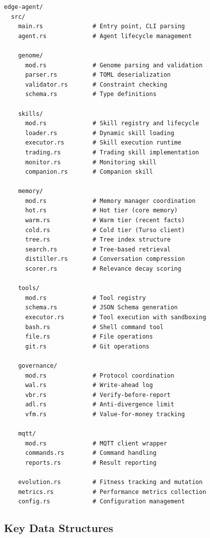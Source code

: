 \documentclass{article}
\begin{document}
\begin{lstlisting}[basicstyle=\ttfamily\footnotesize]
edge-agent/
  src/
    main.rs              # Entry point, CLI parsing
    agent.rs             # Agent lifecycle management
    
    genome/
      mod.rs             # Genome parsing and validation
      parser.rs          # TOML deserialization
      validator.rs       # Constraint checking
      schema.rs          # Type definitions
      
    skills/
      mod.rs             # Skill registry and lifecycle
      loader.rs          # Dynamic skill loading
      executor.rs        # Skill execution runtime
      trading.rs         # Trading skill implementation
      monitor.rs         # Monitoring skill
      companion.rs       # Companion skill
      
    memory/
      mod.rs             # Memory manager coordination
      hot.rs             # Hot tier (core memory)
      warm.rs            # Warm tier (recent facts)
      cold.rs            # Cold tier (Turso client)
      tree.rs            # Tree index structure
      search.rs          # Tree-based retrieval
      distiller.rs       # Conversation compression
      scorer.rs          # Relevance decay scoring
      
    tools/
      mod.rs             # Tool registry
      schema.rs          # JSON Schema generation
      executor.rs        # Tool execution with sandboxing
      bash.rs            # Shell command tool
      file.rs            # File operations
      git.rs             # Git operations
      
    governance/
      mod.rs             # Protocol coordination
      wal.rs             # Write-ahead log
      vbr.rs             # Verify-before-report
      adl.rs             # Anti-divergence limit
      vfm.rs             # Value-for-money tracking
      
    mqtt/
      mod.rs             # MQTT client wrapper
      commands.rs        # Command handling
      reports.rs         # Result reporting
      
    evolution.rs         # Fitness tracking and mutation
    metrics.rs           # Performance metrics collection
    config.rs            # Configuration management
\end{lstlisting}

\subsection{Key Data Structures}
\end{document}
